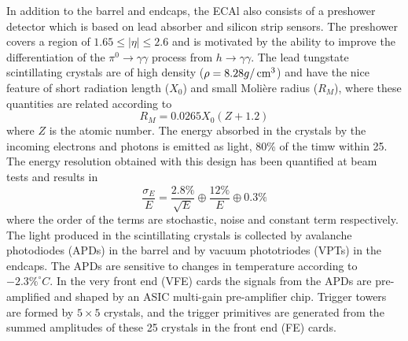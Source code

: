 In addition to the barrel and endcaps, the ECAl also consists of a preshower detector which is based on lead absorber and silicon strip sensors. 
The preshower covers a region of $1.65\leq|\eta|\leq2.6$ and is motivated by the ability to improve the differentiation of the $\pi^{0}\rightarrow\gamma\gamma$ process from $h\rightarrow\gamma\gamma$. 
The lead tungstate scintillating crystals are of high density ($\rho=8.28g/\,\text{cm}^{3}$) and have the nice feature of short radiation length ($X_{0}$) and small Moli\`ere radius ($R_{M}$), where these quantities are related according to
\begin{equation}
R_{M} = 0.0265 X_{0}(Z+1.2)
\end{equation}
where $Z$ is the atomic number.
The energy absorbed in the crystals by the incoming electrons and photons is emitted as light, 80\% of the timw within 25\ns. 
The energy resolution obtained with this design has been quantified at beam tests and results in 
\begin{equation}
\frac{\sigma_{E}}{E}=\frac{2.8\%}{\sqrt{E}}\oplus\frac{12\%}{E}\oplus0.3\%
\end{equation}
where the order of the terms are stochastic, noise and constant term respectively\cite{Chatrchyan:2013dga}. 
The light produced in the scintillating crystals is collected by avalanche photodiodes (APDs) in the barrel and by vacuum phototriodes (VPTs) in the endcaps. 
The APDs are sensitive to changes in temperature according to $-2.3\%^{\circ}C$. 
In the very front end (VFE) cards the signals from the APDs are pre-amplified and shaped by an ASIC multi-gain pre-amplifier chip. 
Trigger towers are formed by $5\times5$ crystals, and the trigger primitives are generated from the summed amplitudes of these 25 crystals in the front end (FE) cards. 
